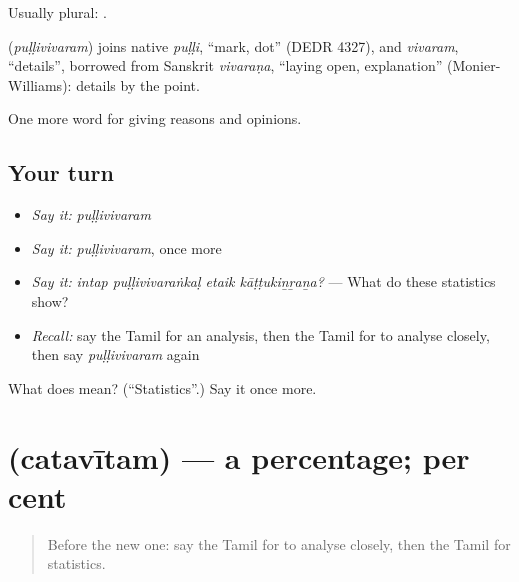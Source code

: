 Usually plural: .

\begin{cousinweb}
\textbf{} (\emph{puḷḷivivaram}) joins native \emph{puḷḷi}, \textquotedblleft{}mark, dot\textquotedblright{} (DEDR 4327), and \emph{vivaram}, \textquotedblleft{}details\textquotedblright{}, borrowed from Sanskrit \emph{vivaraṇa}, \textquotedblleft{}laying open, explanation\textquotedblright{} (Monier-Williams): details by the point.
\end{cousinweb}

\begin{grammarlens}[title={What you've built}]
One more word for giving reasons and opinions.
\end{grammarlens}

\subsection*{Your turn}
\begin{itemize}
\raggedright
  \item \emph{Say it:} \emph{puḷḷivivaram}
  \item \emph{Say it:} \emph{puḷḷivivaram}, once more
  \item \emph{Say it:} \emph{intap puḷḷivivaraṅkaḷ etaik kāṭṭukiṉṟaṉa?} — What do these statistics show?
  \item \emph{Recall:} say the Tamil for an analysis, then the Tamil for to analyse closely, then say \emph{puḷḷivivaram} again
\end{itemize}

\begin{tcolorbox}[breakable,colback=teal!4,colframe=teal!35!black,title={Before you move on}]
What does  mean? (\textquotedblleft{}Statistics\textquotedblright{}.) Say it once more.
\end{tcolorbox}
\section[\texorpdfstring{\ta{சதவீதம்} (catavītam)}{சதவீதம் (catavītam)}]{ (catavītam) — a percentage; per cent}

\label{lesson:TA-C363-catavitam}



\begin{quote}
Before the new one: say the Tamil for to analyse closely, then the Tamil for statistics.
\end{quote}

